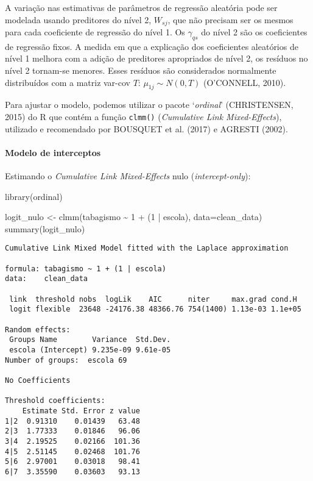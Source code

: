 \documentclass[
]{article}
\let\oldparagraph\paragraph
\renewcommand{\paragraph}[1]{\oldparagraph{#1}\mbox{}}
\newenvironment{Shaded}{\begin{snugshade}}{\end{snugshade}}
\newcommand{\AttributeTok}[1]{\textcolor[rgb]{0.40,0.45,0.13}{#1}}
\newcommand{\DecValTok}[1]{\textcolor[rgb]{0.68,0.00,0.00}{#1}}
\newcommand{\FunctionTok}[1]{\textcolor[rgb]{0.28,0.35,0.67}{#1}}
\newcommand{\NormalTok}[1]{\textcolor[rgb]{0.00,0.23,0.31}{#1}}
\newcommand{\OtherTok}[1]{\textcolor[rgb]{0.00,0.23,0.31}{#1}}
\newcommand{\SpecialCharTok}[1]{\textcolor[rgb]{0.37,0.37,0.37}{#1}}
\begin{document}
A variação nas estimativas de parâmetros de regressão aleatória pode ser
modelada usando preditores do nível 2, \(W_{sj}\), que não precisam ser
os mesmos para cada coeficiente de regressão do nível 1. Os
\(\gamma_{qs}\) do nível 2 são os coeficientes de regressão fixos. A
medida em que a explicação dos coeficientes aleatórios de nível 1
melhora com a adição de preditores apropriados de nível 2, os resíduos
no nível 2 tornam-se menores. Esses resíduos são considerados
normalmente distribuídos com a matriz var-cov \(T\):
\(\mu_{1j} \sim N(0, T)\) (O'CONNELL, 2010).

Para ajustar o modelo, podemos utilizar o pacote `\emph{ordinal}'
(CHRISTENSEN, 2015) do R que contém a função \texttt{clmm()}
(\emph{Cumulative Link Mixed-Effects}), utilizado e recomendado por
BOUSQUET et al. (2017) e AGRESTI (2002).

\hypertarget{modelo-de-interceptos}{%
\paragraph{Modelo de interceptos}\label{modelo-de-interceptos}}

Estimando o \emph{Cumulative Link Mixed-Effects} nulo
(\emph{intercept-only}):

\begin{Shaded}
\begin{Highlighting}[]
\FunctionTok{library}\NormalTok{(ordinal)}

\NormalTok{logit\_nulo }\OtherTok{\textless{}{-}} \FunctionTok{clmm}\NormalTok{(tabagismo }\SpecialCharTok{\textasciitilde{}} \DecValTok{1} \SpecialCharTok{+}\NormalTok{ (}\DecValTok{1} \SpecialCharTok{|}\NormalTok{ escola), }\AttributeTok{data=}\NormalTok{clean\_data)}
\FunctionTok{summary}\NormalTok{(logit\_nulo)}
\end{Highlighting}
\end{Shaded}

\begin{verbatim}
Cumulative Link Mixed Model fitted with the Laplace approximation

formula: tabagismo ~ 1 + (1 | escola)
data:    clean_data

 link  threshold nobs  logLik    AIC      niter     max.grad cond.H 
 logit flexible  23648 -24176.38 48366.76 754(1400) 1.13e-03 1.1e+05

Random effects:
 Groups Name        Variance  Std.Dev.
 escola (Intercept) 9.235e-09 9.61e-05
Number of groups:  escola 69 

No Coefficients

Threshold coefficients:
    Estimate Std. Error z value
1|2  0.91310    0.01439   63.48
2|3  1.77333    0.01846   96.06
3|4  2.19525    0.02166  101.36
4|5  2.51145    0.02468  101.76
5|6  2.97001    0.03018   98.41
6|7  3.35590    0.03603   93.13
\end{verbatim}
\end{document}
